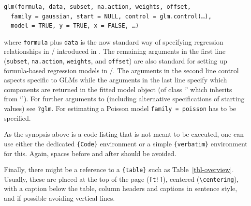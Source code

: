 \documentclass[
  nojss,
  article]{jss}
\newcommand{\class}[1]{`\code{#1}'}
\newcommand{\fct}[1]{\code{#1()}}
\begin{document}
\begin{verbatim}
glm(formula, data, subset, na.action, weights, offset,
  family = gaussian, start = NULL, control = glm.control(…),
  model = TRUE, y = TRUE, x = FALSE, …)
\end{verbatim}

where \texttt{formula} plus \texttt{data} is the now standard way of
specifying regression relationships in /
introduced in \citet{ChambersHastie1992}. The remaining arguments in the
first line (\texttt{subset}, \texttt{na.action}, \texttt{weights}, and
\texttt{offset}) are also standard for setting up formula-based
regression models in /. The arguments in the
second line control aspects specific to GLMs while the arguments in the
last line specify which components are returned in the fitted model
object (of class \class{glm} which inherits from \class{lm}). For
further arguments to \fct{glm} (including alternative specifications of
starting values) see \texttt{?glm}. For estimating a Poisson model
\texttt{family\ =\ poisson} has to be specified.

\begin{tcolorbox}[enhanced jigsaw, bottomrule=.15mm, breakable, toprule=.15mm, opacityback=0, colframe=quarto-callout-color-frame, left=2mm, rightrule=.15mm, arc=.35mm, leftrule=.75mm, colback=white]

As the synopsis above is a code listing that is not meant to be
executed, one can use either the dedicated \texttt{\{Code\}} environment
or a simple \texttt{\{verbatim\}} environment for this. Again, spaces
before and after should be avoided.

Finally, there might be a reference to a \texttt{\{table\}} such as
Table~\ref{tbl-overview}. Usually, these are placed at the top of the
page (\texttt{{[}t!{]}}), centered (\texttt{\textbackslash{}centering}),
with a caption below the table, column headers and captions in sentence
style, and if possible avoiding vertical lines.

\end{tcolorbox}
\end{document}
